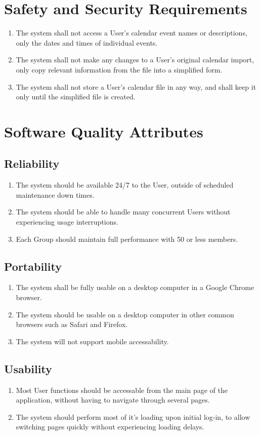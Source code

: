 \documentclass{scrreprt}
\begin{document}
\section{Safety and Security Requirements}
\begin{enumerate}
\item The system shall not access a User's calendar event names or descriptions, 
only the dates and times of individual events.
\item The system shall not make any changes to a User's original calendar import,
only copy relevant information from the file into a simplified form.
\item The system shall not store a User's calendar file in any way, and shall
keep it only until the simplified file is created.
\end{enumerate}

\section{Software Quality Attributes}

\subsection{Reliability}
\begin{enumerate}
\item The system should be available 24/7 to the User, outside of scheduled maintenance
down times.
\item The system should be able to handle many concurrent Users without experiencing
usage interruptions.
\item Each Group should maintain full performance with 50 or less members. 
\end{enumerate}

\subsection{Portability}
\begin{enumerate}
\item The system shall be fully usable on a desktop computer in a Google Chrome
browser.
\item The system should be usable on a desktop computer in other common browsers
such as Safari and Firefox.
\item The system will not support mobile accessability.
\end{enumerate}

\subsection{Usability}
\begin{enumerate}
\item Most User functions should be accessable from the main page of the application,
without having to navigate through several pages.
\item The system should perform most of it's loading upon initial log-in, to allow
switching pages quickly without experiencing loading delays.
\end{enumerate}
\end{document}
